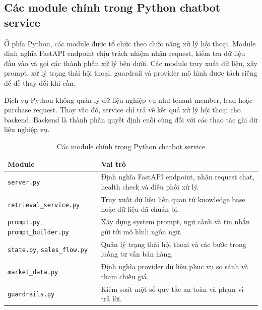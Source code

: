 \documentclass[../DoAn.tex]{subfiles}
\begin{document}
%

\subsection{Các module chính trong Python chatbot service}

Ở phía Python, các module được tổ chức theo chức năng xử lý hội thoại. Module định nghĩa FastAPI endpoint chịu trách nhiệm nhận request, kiểm tra dữ liệu đầu vào và gọi các thành phần xử lý bên dưới. Các module truy xuất dữ liệu, xây prompt, xử lý trạng thái hội thoại, guardrail và provider mô hình được tách riêng để dễ thay đổi khi cần.

Dịch vụ Python không quản lý dữ liệu nghiệp vụ như tenant member, lead hoặc purchase request. Thay vào đó, service chỉ trả về kết quả xử lý hội thoại cho backend. Backend là thành phần quyết định cuối cùng đối với các thao tác ghi dữ liệu nghiệp vụ.

\begin{table}[H]
\centering
\caption{Các module chính trong Python chatbot service}
\label{tab:ch4-python-modules}
\begin{tabular}{|p{}|p{}|}
\hline
\textbf{Module} & \textbf{Vai trò} \\
\hline
\texttt{server.py} & Định nghĩa FastAPI endpoint, nhận request chat, health check và điều phối xử lý. \\
\hline
\texttt{retrieval\_service.py} & Truy xuất dữ liệu liên quan từ knowledge base hoặc dữ liệu đã chuẩn bị. \\
\hline
\texttt{prompt.py}, \texttt{prompt\_builder.py} & Xây dựng system prompt, ngữ cảnh và tin nhắn gửi tới mô hình ngôn ngữ. \\
\hline
\texttt{state.py}, \texttt{sales\_flow.py} & Quản lý trạng thái hội thoại và các bước trong luồng tư vấn bán hàng. \\
\hline
\texttt{market\_data.py} & Định nghĩa provider dữ liệu phục vụ so sánh và tham chiếu giá. \\
\hline
\texttt{guardrails.py} & Kiểm soát một số quy tắc an toàn và phạm vi trả lời. \\
\hline
\end{tabular}
\end{table}
\end{document}
